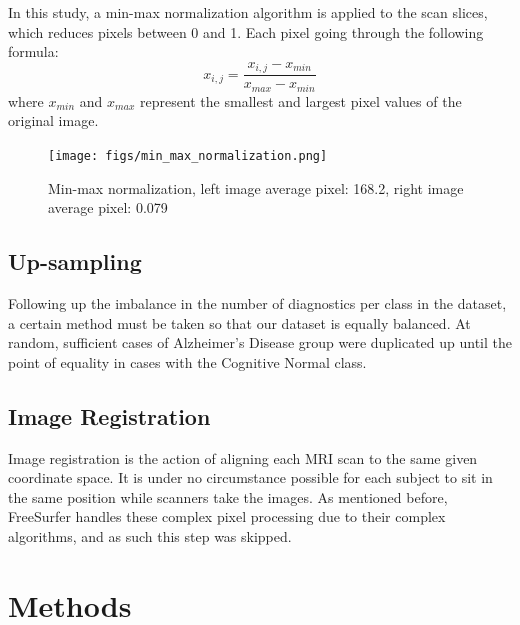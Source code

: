 \documentclass[a4paper, 12pt]{article}
\begin{document}
In this study, a min-max normalization algorithm is applied to the scan slices, which reduces pixels between 0 and 1. Each pixel going
through the following formula:
$$
    x_{i,j} = \frac{x_{i,j} - x_{min}}{x_{max} - x_{min}}
$$
where $x_{min}$ and $x_{max}$ represent the smallest and largest pixel values of the original image.

\begin{figure}[htbp]
    \centering
    \texttt{[image: figs/min\_max\_normalization.png]}
    \caption{Min-max normalization, left image average pixel: 168.2, right image average pixel: 0.079}
    \label{fig:min_max_normalization}
\end{figure}

\subsection{Up-sampling}
Following up the imbalance in the number of diagnostics per class in the dataset, a certain method must be taken so that our dataset is equally balanced.
At random, sufficient cases of Alzheimer's Disease group were duplicated up until the point of equality in cases with the Cognitive Normal class.

\subsection{Image Registration}
Image registration is the action of aligning each MRI scan to the same given coordinate space. It is under no circumstance possible for each
subject to sit in the same position while scanners take the images. As mentioned before, FreeSurfer handles these complex pixel processing
due to their complex algorithms, and as such this step was skipped.

\newpage
\section{Methods}



\end{document}
